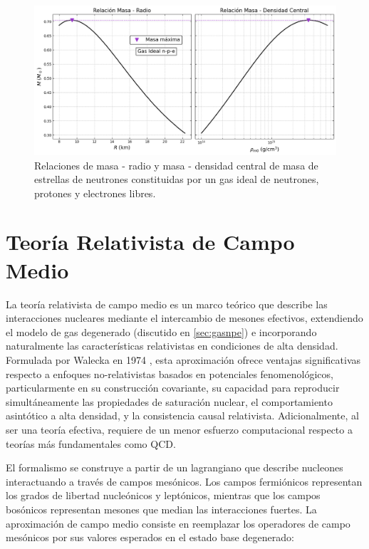 \begin{figure}
	\centering
	\includegraphics[width=0.9\linewidth]{Figuras/gas_npe_MR}
	\caption[Relaciones masa-radio de gas ideal degenerado]{Relaciones de masa - radio y masa - densidad central de masa de estrellas de neutrones constituidas por un gas ideal de neutrones, protones y electrones libres.}
	\label{fig:mrnpe}
\end{figure}



\section{Teoría Relativista de Campo Medio}
\label{sec:rmft}

La teoría relativista de campo medio es un marco teórico que describe las interacciones nucleares mediante el intercambio de mesones efectivos, extendiendo el modelo de gas degenerado (discutido en \ref{sec:gasnpe}) e incorporando naturalmente las características relativistas en condiciones de alta densidad. Formulada por Walecka en 1974 \cite{waleckaTheoryHighlyCondensed1974}, esta aproximación ofrece ventajas significativas respecto a enfoques no-relativistas basados en potenciales fenomenológicos, particularmente en su construcción covariante, su capacidad para reproducir simultáneamente las propiedades de saturación nuclear, el comportamiento asintótico a alta densidad, y la consistencia causal relativista. Adicionalmente, al ser una teoría efectiva, requiere de un menor esfuerzo computacional respecto a teorías más fundamentales como QCD.

El formalismo se construye a partir de un lagrangiano que describe nucleones interactuando a través de campos mesónicos. Los campos fermiónicos representan los grados de libertad nucleónicos y leptónicos, mientras que los campos bosónicos representan mesones que median las interacciones fuertes. La aproximación de campo medio consiste en reemplazar los operadores de campo mesónicos por sus valores esperados en el estado base degenerado:

